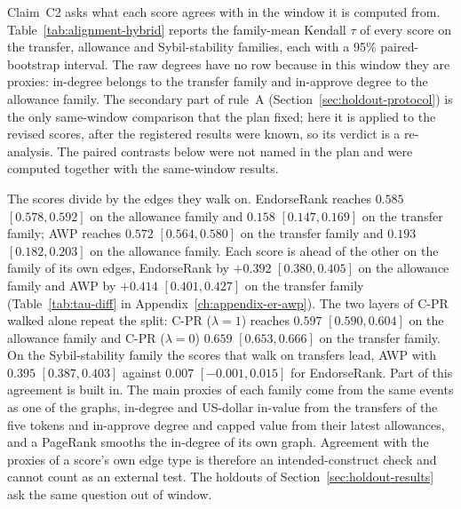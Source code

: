 
Claim~C2 asks what each score agrees with in the window it is computed from. Table~\ref{tab:alignment-hybrid} reports the family-mean Kendall $\tau$ of every score on the transfer, allowance and Sybil-stability families, each with a 95\% paired-bootstrap interval. The raw degrees have no row because in this window they are proxies: in-degree belongs to the transfer family and in-approve degree to the allowance family. The secondary part of rule~A (Section~\ref{sec:holdout-protocol}) is the only same-window comparison that the plan fixed; here it is applied to the revised scores, after the registered results were known, so its verdict is a re-analysis. The paired contrasts below were not named in the plan and were computed together with the same-window results.



The scores divide by the edges they walk on. EndorseRank reaches $0.585$ $[0.578,0.592]$ on the allowance family and $0.158$ $[0.147,0.169]$ on the transfer family; AWP reaches $0.572$ $[0.564,0.580]$ on the transfer family and $0.193$ $[0.182,0.203]$ on the allowance family. Each score is ahead of the other on the family of its own edges, EndorseRank by $+0.392$ $[0.380,0.405]$ on the allowance family and AWP by $+0.414$ $[0.401,0.427]$ on the transfer family (Table~\ref{tab:tau-diff} in Appendix~\ref{ch:appendix-er-awp}). The two layers of C-PR walked alone repeat the split: C-PR ($\lambda=1$) reaches $0.597$ $[0.590,0.604]$ on the allowance family and C-PR ($\lambda=0$) $0.659$ $[0.653,0.666]$ on the transfer family. On the Sybil-stability family the scores that walk on transfers lead, AWP with $0.395$ $[0.387,0.403]$ against $0.007$ $[-0.001,0.015]$ for EndorseRank. Part of this agreement is built in. The main proxies of each family come from the same events as one of the graphs, in-degree and US-dollar in-value from the transfers of the five tokens and in-approve degree and capped value from their latest allowances, and a PageRank smooths the in-degree of its own graph. Agreement with the proxies of a score's own edge type is therefore an intended-construct check and cannot count as an external test. The holdouts of Section~\ref{sec:holdout-results} ask the same question out of window.

